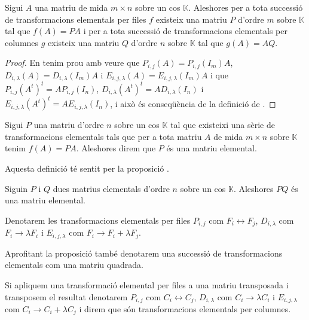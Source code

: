 \documentclass[../../Main.tex]{subfiles}
\begin{document}
	\begin{proposition}
		\label{prop:transformacions elementals i matrius elementals}
		Sigui \(A\) una matriu de mida \(m\times n\) sobre un cos \(\mathbb{K}\). Aleshores per a tota successió de transformacions elementals per files \(f\) existeix una matriu \(P\) d'ordre \(m\) sobre \(\mathbb{K}\) tal que \(f(A)=PA\) i per a tota successió de transformacions elementals per columnes \(g\) existeix una matriu \(Q\) d'ordre \(n\) sobre \(\mathbb{K}\) tal que \(g(A)=AQ\).
%		
		\begin{proof}
			En tenim prou amb veure que \(P_{i,j}(A)=P_{i,j}(I_{m})A\), \(D_{i,\lambda}(A)=D_{i,\lambda}(I_{m})A\) i \(E_{i,j,\lambda}(A)=E_{i,j,\lambda}(I_{m})A\) i que \(P_{i,j}(A^{t})^{t}=AP_{i,j}(I_{n})\), \(D_{i,\lambda}(A^{t})^{t}=AD_{i,\lambda}(I_{n})\) i \(E_{i,j,\lambda}(A^{t})^{t}=AE_{i,j,\lambda}(I_{n})\), i això és conseqüència de la definició de .
		\end{proof}
	\end{proposition}
	\begin{definition}
		\label{def:matriu elemental}
		Sigui \(P\) una matriu d'ordre \(n\) sobre un cos \(\mathbb{K}\) tal que existeixi una sèrie de transformacions elementals tals que per a tota matriu \(A\) de mida \(m\times n\) sobre \(\mathbb{K}\) tenim \(f(A)=PA\). Aleshores direm que \(P\) és una matriu elemental.
		
		Aquesta definició té sentit per la proposició .
	\end{definition}
	\begin{observation}
		\label{obs:producte de matrius elementals és matriu elemental}
		Siguin \(P\) i \(Q\) dues matrius elementals d'ordre \(n\) sobre un cos \(\mathbb{K}\). Aleshores \(PQ\) és una matriu elemental.
	\end{observation}
	\begin{notation}
		Denotarem les transformacions elementals per files \(P_{i,j}\) com \(F_{i}\leftrightarrow F_{j}\), \(D_{i,\lambda}\) com \(F_{i}\rightarrow\lambda F_{i}\) i \(E_{i,j,\lambda}\) com \(F_{i}\rightarrow F_{i}+\lambda F_{j}\).
		
		Aprofitant la proposició  també denotarem una successió de transformacions elementals com una matriu quadrada.
		
		Si apliquem una transformació elemental per files a una matriu transposada i transposem el resultat denotarem \(P_{i,j}\) com \(C_{i}\leftrightarrow C_{j}\), \(D_{i,\lambda}\) com \(C_{i}\rightarrow\lambda C_{i}\) i \(E_{i,j,\lambda}\) com \(C_{i}\rightarrow C_{i}+\lambda C_{j}\) i direm que són transformacions elementals per columnes.
	\end{notation}
\end{document}

